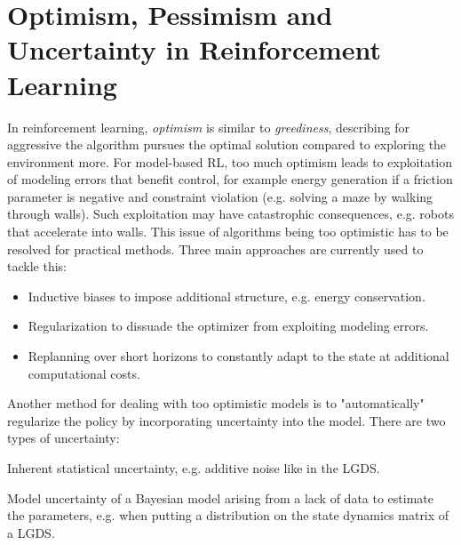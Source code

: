 	\section{Optimism, Pessimism and Uncertainty in Reinforcement Learning}
		In reinforcement learning, \emph{optimism} is similar to \emph{greediness}, describing for aggressive the algorithm pursues the optimal solution compared to exploring the environment more. For model-based RL, too much optimism leads to exploitation of modeling errors that benefit control, for example energy generation if a friction parameter is negative and constraint violation (e.g. solving a maze by walking through walls). Such exploitation may have catastrophic consequences, e.g. robots that accelerate into walls. This issue of algorithms being too optimistic has to be resolved for practical methods. Three main approaches are currently used to tackle this:
		\begin{itemize}
			\item Inductive biases to impose additional structure, e.g. energy conservation.
			\item Regularization to dissuade the optimizer from exploiting modeling errors.
			\item Replanning over short horizons to constantly adapt to the state at additional computational costs.
		\end{itemize}
		Another method for dealing with too optimistic models is to "automatically" regularize the policy by incorporating uncertainty into the model. There are two types of uncertainty:
		\begin{description}[leftmargin=3cm]
			\item[Aleatoric] Inherent statistical uncertainty, e.g. additive noise like in the LGDS.
			\item[Epistemic] Model uncertainty of a Bayesian model arising from a lack of data to estimate the parameters, e.g. when putting a distribution on the state dynamics matrix of a LGDS.
		\end{description}

